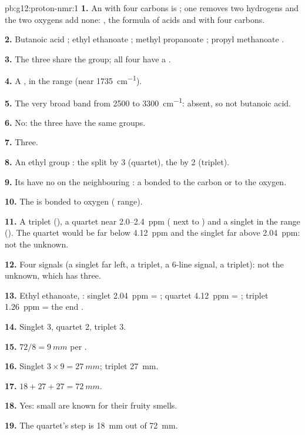 \begin{solution}{pb:g12:proton-nmr:1}
\textbf{1.} An  with four carbons is ; one 
removes two hydrogens and the two oxygens add none: , the
formula of acids and  with four carbons.

\textbf{2.} Butanoic acid ; ethyl ethanoate
; methyl propanoate ; propyl
methanoate .

\textbf{3.} The three  share the  group; all four have a
.

\textbf{4.} A , in the  range (near \qty{1735}{cm^{-1}}).

\textbf{5.} The very broad  band from 2500 to
\qty{3300}{cm^{-1}}: absent, so not butanoic acid.

\textbf{6.} No: the three  have the same groups.

\textbf{7.} Three.

\textbf{8.} An ethyl group : the  split by 3
 (quartet), the  by 2 (triplet).

\textbf{9.} Its  have no  on the neighbouring : a
 bonded to the  carbon or to the  oxygen.

\textbf{10.} The  is bonded to oxygen ( range).

\textbf{11.} A triplet (), a quartet near 2.0--\qty{2.4}{ppm}
( next to ) and a singlet in the  range
(). The quartet would be far below \qty{4.12}{ppm} and the
singlet far above \qty{2.04}{ppm}: not the unknown.

\textbf{12.} Four signals (a singlet far left, a triplet, a 6-line
signal, a triplet): not the unknown, which has three.

\textbf{13.} Ethyl ethanoate, : singlet
\qty{2.04}{ppm} = ; quartet \qty{4.12}{ppm} = ;
triplet \qty{1.26}{ppm} = the end .

\textbf{14.} Singlet 3, quartet 2, triplet 3.

\textbf{15.} $72 / 8 = \qty{9}{mm}$ per .

\textbf{16.} Singlet $3 \times 9 = \qty{27}{mm}$; triplet
\qty{27}{mm}.

\textbf{17.} $18 + 27 + 27 = \qty{72}{mm}$.

\textbf{18.} Yes: small  are known for their fruity smells.

\textbf{19.} The quartet's step is \qty{18}{mm} out of \qty{72}{mm}.
\end{solution}
